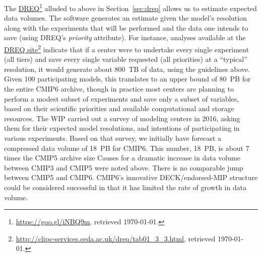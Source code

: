 \documentclass[gmd,manuscript]{copernicus}
\newcommand{\pllabel}[1]{\label{p-#1}\linelabel{l-#1}}
\newcommand{\urlref}[2] {\href{#1}{#2}\footnote{\url{#1}, retrieved \today.}}
\begin{document}
The \urlref{https://goo.gl/iNBQ9m}{DREQ} alluded to above in
Section~\ref{sec:dreq} allows us to estimate expected data volumes.  
 The software generates an estimate given the model's
resolution along with the experiments that will be performed and the
data one intends to save (using DREQ's \emph{priority} attribute).
\pllabel{RC2-23}
 For instance,
analyses available at the
\urlref{http://clipc-services.ceda.ac.uk/dreq/tab01_3_3.html}{DREQ
  site} indicate that if a center were to undertake every single
experiment (all tiers) and save every single variable requested (all
priorities) at a ``typical'' resolution, it would generate about
800~TB of data, using the guidelines above. Given 100 participating
models, this translates to an upper bound of 80~PB for the entire
CMIP6 archive, though in practice most centers are planning to perform
a modest subset of experiments and save only a subset of variables, based on
their scientific priorities and available computational and storage
resources. The WIP carried out a survey of modeling centers in 2016,
asking them for their expected model resolutions, and intentions of
participating in various experiments. Based on that survey, we
initially have forecast a
\pllabel{RC1-27}
compressed data volume of 18~PB for CMIP6. This number, 18~PB, is
about 7 times the CMIP5
\pllabel{RC1-28}
 archive
size
\pllabel{RC1-29b}
Causes for a dramatic increase in data volume between CMIP3 and CMIP5
were noted above. There is no comparable jump between CMIP5 and CMIP6.
CMIP6's innovative DECK/endorsed-MIP structure could be considered 
successful in that it has limited the rate of growth in data volume.  
\end{document}

